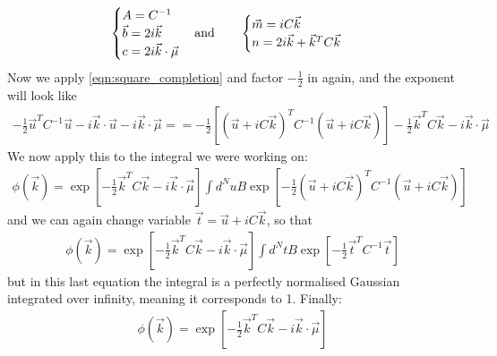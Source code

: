 \documentclass[a4paper,11pt,fleqn]{article}
\begin{document}
\begin{equation*}
    \begin{cases}
        A = C^{-1} \\
        \vec{b} = 2i\vec{k} \\
        c = 2i\vec{k}\cdot \vec{\mu}
    \end{cases}
    \textnormal{and} \qquad 
    \begin{cases}
        \vec{m} = iC\vec{k} \\
        n = 2i\vec{k} + \vec{k}^TC\vec{k}
    \end{cases}
\end{equation*}
Now we apply \ref{eqn:square_completion} and factor $-\frac{1}{2}$ in again, and the exponent will look like
\begin{multline*}
    -\frac{1}{2}\vec{u}^TC^{-1}\vec{u} - i \vec{k}\cdot \vec{u} -i \vec{k}\cdot \vec{\mu} = = -\frac{1}{2}\left[(\vec{u}+iC\vec{k})^T C^{-1} (\vec{u}+iC\vec{k})\right] -\frac{1}{2}\vec{k}^T C \vec{k} - i \vec{k} \cdot\vec{\mu}
\end{multline*}
We now apply this to the integral we were working on:
\begin{gather*}
    \phi(\vec{k}) = \exp{\left[-\frac{1}{2}\vec{k}^T C \vec{k} - i \vec{k}\cdot \vec{\mu}\right]} \int d^N u B \exp{\left[ -\frac{1}{2}(\vec{u}+iC\vec{k})^T C^{-1} (\vec{u}+iC\vec{k}) \right]}
\end{gather*}
and we can again change variable $\vec{t} = \vec{u}+iC\vec{k}$, so that
\begin{gather*}
    \phi(\vec{k}) = \exp{\left[-\frac{1}{2}\vec{k}^T C \vec{k} - i \vec{k}\cdot \vec{\mu}\right]} \int d^N t B \exp{\left[ -\frac{1}{2}\vec{t}^T C^{-1} \vec{t} \right]}
\end{gather*}
but in this last equation the integral is a perfectly normalised Gaussian integrated over infinity, meaning
it corresponds to 1. Finally:
\begin{gather*}
    \phi(\vec{k}) = \exp{\left[-\frac{1}{2}\vec{k}^T C \vec{k} - i \vec{k} \cdot \vec{\mu}\right]}
\end{gather*}
\end{document}
